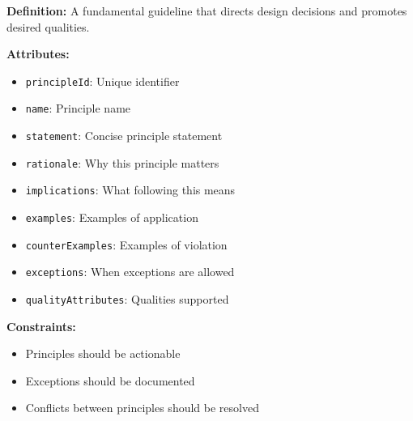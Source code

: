 \documentclass[11pt,letterpaper]{article}
\begin{document}
\begin{definitionbox}
\textbf{Definition:} A fundamental guideline that directs design decisions and promotes desired qualities.

\textbf{Attributes:}
\begin{itemize}[nosep]
    \item \texttt{principleId}: Unique identifier
    \item \texttt{name}: Principle name
    \item \texttt{statement}: Concise principle statement
    \item \texttt{rationale}: Why this principle matters
    \item \texttt{implications}: What following this means
    \item \texttt{examples}: Examples of application
    \item \texttt{counterExamples}: Examples of violation
    \item \texttt{exceptions}: When exceptions are allowed
    \item \texttt{qualityAttributes}: Qualities supported
\end{itemize}

\textbf{Constraints:}
\begin{itemize}[nosep]
    \item Principles should be actionable
    \item Exceptions should be documented
    \item Conflicts between principles should be resolved
\end{itemize}
\end{definitionbox}
\end{document}
